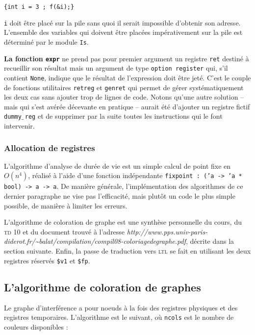 \documentclass[11pt, a4paper]{article}
\newcommand{\prog}[1]{{\tt#1}}
\newcommand{\underscore}{$\_\,$}
\begin{document}
\begin{center}\prog{\{int i = 3\ ; f(\&i);\}}\end{center}

\prog{i} doit être placé sur la pile sans quoi il serait impossible d'obtenir son adresse. L'ensemble des variables qui doivent être placées impérativement sur la pile est déterminé par le module \prog{Is}.

\textbf{La fonction \prog{expr}} ne prend pas pour premier argument un registre \prog{ret} destiné à recueillir son résultat mais un argument de type \prog{option register} qui, s'il contient \prog{None}, indique que le résultat de l'expression doit être jeté. C'est le couple de fonctions utilitaires \prog{retreg} et \prog{genret} qui permet de gérer systématiquement les deux cas sans ajouter trop de lignes de code. Notons qu'une autre solution -- mais qui s'est avérée décevante en pratique -- aurait été d'ajouter un registre fictif \prog{dummy\underscore{}reg} et de supprimer par la suite toutes les instructions qui le font intervenir.

\subsubsection{Allocation de registres}

L'algorithme d'analyse de durée de vie est un simple calcul de point fixe en $O(n^4)$, réalisé à l'aide d'une fonction indépendante \prog{fixpoint : ('a -> 'a * bool) -> a -> a}. De manière générale, l'implémentation des algorithmes de ce dernier paragraphe ne vise pas l'efficacité, mais plutôt un code le plus simple possible, de manière à limiter les erreurs.

\medskip

L'algorithme de coloration de graphe est une synthèse personnelle du cours, du \textsc{td} 10 et du document trouvé à l'adresse \emph{http://www.pps.univ-paris-diderot.fr/\textasciitilde{}balat/compilation/compil08-coloriagedegraphe.pdf}, décrite dans la section suivante. Enfin, la passe de traduction vers \textsc{ltl} se fait en utilisant les deux registres réservés \prog{\$v1} et \prog{\$fp}.


\subsection{L'algorithme de coloration de graphes}

Le graphe d'interférence a pour noeuds à la fois des registres physiques et des registres temporaires. L'algorithme est le suivant, où \prog{ncols} est le nombre de couleurs disponibles :
\end{document}
